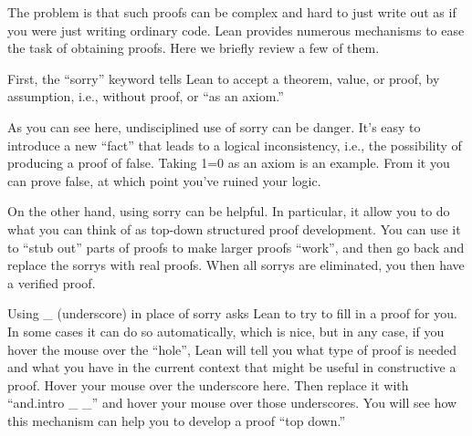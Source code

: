\documentclass[letterpaper,10pt,english]{sphinxmanual}
\begin{document}
The problem is that such proofs can be complex and hard to just write
out as if you were just writing ordinary code. Lean provides numerous
mechanisms to ease the task of obtaining proofs.  Here we briefly
review a few of them.

First, the “sorry” keyword tells Lean to accept a theorem, value, or
proof, by assumption, i.e., without proof, or “as an axiom.”

\begin{sphinxVerbatim}[commandchars=\\\{\}]
      
\end{sphinxVerbatim}

As you can see here, undisciplined use of sorry can be danger. It’s
easy to introduce a new “fact” that leads to a logical inconsistency,
i.e., the possibility of producing a proof of false. Taking 1=0 as an
axiom is an example. From it you can prove false, at which point
you’ve ruined your logic.

On the other hand, using sorry can be helpful. In particular, it allow
you to do what you can think of as top-down structured proof
development. You can use it to “stub out” parts of proofs to make
larger proofs “work”, and then go back and replace the sorrys with
real proofs.  When all sorrys are eliminated, you then have a verified
proof.

Using \_ (underscore) in place of sorry asks Lean to try to fill in a
proof for you. In some cases it can do so automatically, which is
nice, but in any case, if you hover the mouse over the “hole”, Lean
will tell you what type of proof is needed and what you have in the
current context that might be useful in constructive a proof. Hover
your mouse over the underscore here. Then replace it with “and.intro \_
\_” and hover your mouse over those underscores. You will see how this
mechanism can help you to develop a proof “top down.”

\begin{sphinxVerbatim}[commandchars=\\\{\}]
                
\end{sphinxVerbatim}
\end{document}
